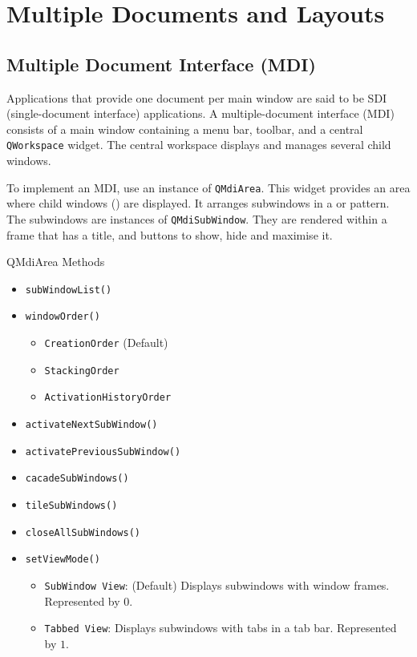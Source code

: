 \documentclass[notes.tex]{subfiles}
\begin{document}
	\setcounter{chapter}{2}
	\chapter{Multiple Documents and Layouts}
		\section{Multiple Document Interface (MDI)}
			Applications that provide one document per main window are said to be SDI (single-document interface) applications. A multiple-document interface (MDI) consists of a main window containing a menu bar, toolbar, and a central \verb|QWorkspace| widget. The central workspace displays and manages several child windows.

			To implement an MDI, use an instance of \verb|QMdiArea|. This widget provides an area where child windows () are displayed. It arranges subwindows in a  or  pattern. The subwindows are instances of \verb|QMdiSubWindow|. They are rendered within a frame that has a title, and buttons to show, hide and maximise it.

			\begin{sidenote}{QMdiArea Methods}
				\begin{itemize}[nosep]
					\item \verb|subWindowList()|
					\item \verb|windowOrder()|
						\begin{itemize}[nosep]
							\item \verb|CreationOrder| (Default)
							\item \verb|StackingOrder|
							\item \verb|ActivationHistoryOrder|
						\end{itemize}
					\item \verb|activateNextSubWindow()|
					\item \verb|activatePreviousSubWindow()|
					\item \verb|cacadeSubWindows()|
					\item \verb|tileSubWindows()|
					\item \verb|closeAllSubWindows()|
					\item \verb|setViewMode()|
						\begin{itemize}[nosep]
							\item \verb|SubWindow View|: (Default) Displays subwindows with window frames. Represented by $0$.
							\item \verb|Tabbed View|: Displays subwindows with tabs in a tab bar. Represented by $1$.
						\end{itemize}
				\end{itemize}
			\end{sidenote}
\end{document}
